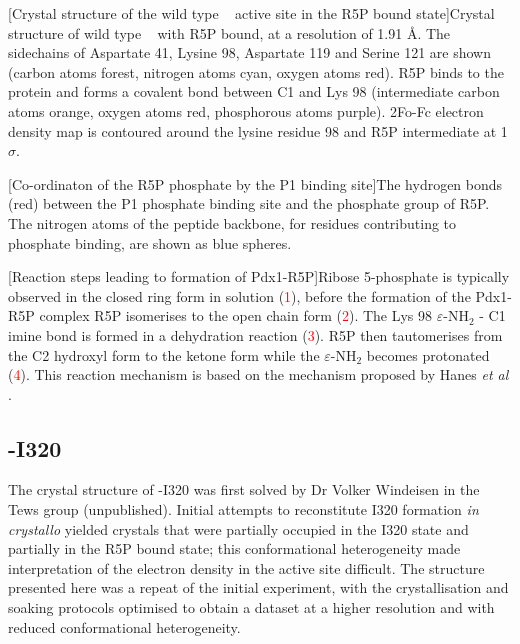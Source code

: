 \begin{minipage}{\linewidth}
	[Crystal structure of the wild type \atpdx~ active site in the R5P bound state]{Crystal structure of wild type \atpdx~ with R5P bound, at a resolution of 1.91 \si{\angstrom}. The sidechains of Aspartate 41, Lysine 98, Aspartate 119 and Serine 121 are shown (carbon atoms forest, nitrogen atoms cyan, oxygen atoms red). R5P binds to the protein and forms a covalent bond between C1 and Lys 98 (intermediate carbon atoms orange, oxygen atoms red, phosphorous atoms purple). 2Fo-Fc electron density map is contoured around the lysine residue 98 and R5P intermediate at 1 $\sigma$.\label{fig:Pdx1_R5P}} 		
\end{minipage}   

\begin{minipage}{\linewidth}
	[Co-ordinaton of the R5P phosphate by the P1 binding site]{The hydrogen bonds (red) between the P1 phosphate binding site and the phosphate group of R5P. The nitrogen atoms of the peptide backbone, for residues contributing to phosphate binding, are shown as blue spheres. \label{fig:Pdx1_R5P_P1}} 		
\end{minipage}       

\begin{minipage}{\linewidth}
	[Reaction steps leading to formation of Pdx1-R5P]{Ribose 5-phosphate is typically observed in the closed ring form in solution (\textcolor{red}{1}), before the formation of the Pdx1-R5P complex R5P isomerises to the open chain form (\textcolor{red}{2}). The Lys 98 $\varepsilon$-NH$_2$ - C1 imine bond is formed in a dehydration reaction (\textcolor{red}{3}). R5P then tautomerises from the C2 hydroxyl form to the ketone form while the $\varepsilon$-NH$_2$ becomes protonated (\textcolor{red}{4}). This reaction mechanism is based on the mechanism proposed by Hanes \textit{et al} \cite{Hanes2008b}. \label{fig:R5P_isomers}} 		
\end{minipage}  
\clearpage
\subsection{\atpdx -I320}
The crystal structure of \atpdx -I320 was first solved by Dr Volker Windeisen in the Tews group (unpublished). Initial attempts to reconstitute I320 formation \textit{in crystallo} yielded crystals that were partially occupied in the I320 state and partially in the R5P bound state; this conformational heterogeneity made interpretation of the electron density in the active site difficult. The structure presented here was a repeat of the initial experiment, with the crystallisation and soaking protocols optimised to obtain a dataset at a higher resolution and with reduced conformational heterogeneity.\par

